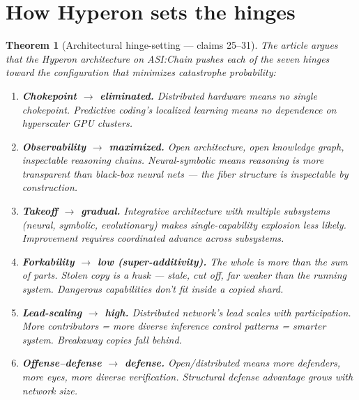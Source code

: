 \documentclass[11pt,a4paper]{article}
\newtheorem{theorem}[definition]{Theorem}
\begin{document}
\section{How Hyperon sets the hinges}
\label{sec:hyperon-hinges}

\begin{theorem}[Architectural hinge-setting --- claims 25--31]
\label{thm:hyperon}
The article argues that the Hyperon architecture on ASI:Chain
pushes each of the seven hinges toward the configuration that
minimizes catastrophe probability:

\begin{enumerate}
\item \textbf{Chokepoint $\to$ eliminated.} Distributed hardware
  means no single chokepoint. Predictive coding's localized
  learning means no dependence on hyperscaler GPU clusters.

\item \textbf{Observability $\to$ maximized.} Open architecture,
  open knowledge graph, inspectable reasoning chains.
  Neural-symbolic means reasoning is more transparent than
  black-box neural nets --- the fiber structure is inspectable
  by construction.

\item \textbf{Takeoff $\to$ gradual.} Integrative architecture
  with multiple subsystems (neural, symbolic, evolutionary)
  makes single-capability explosion less likely. Improvement
  requires coordinated advance across subsystems.

\item \textbf{Forkability $\to$ low (super-additivity).} The whole
  is more than the sum of parts. Stolen copy is a husk ---
  stale, cut off, far weaker than the running system. Dangerous
  capabilities don't fit inside a copied shard.

\item \textbf{Lead-scaling $\to$ high.} Distributed network's lead
  scales with participation. More contributors = more diverse
  inference control patterns = smarter system. Breakaway copies
  fall behind.

\item \textbf{Offense--defense $\to$ defense.} Open/distributed
  means more defenders, more eyes, more diverse verification.
  Structural defense advantage grows with network size.


\end{enumerate}
\end{theorem}
\end{document}
